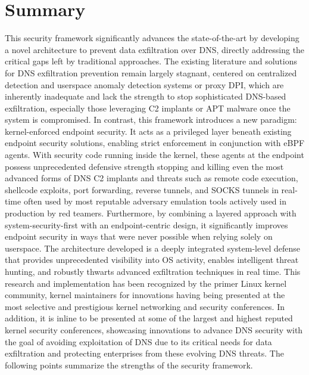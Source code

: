\documentclass [11pt, proquest] {uwthesis}[2020/02/24]
\begin{document}
\section{Summary}
This security framework significantly advances the state-of-the-art by developing a novel architecture to prevent data exfiltration over DNS, directly addressing the critical gaps left by traditional approaches. The existing literature and solutions for DNS exfiltration prevention remain largely stagnant, centered on centralized detection and userspace anomaly detection systems or proxy DPI, which are inherently inadequate and lack the strength to stop sophisticated DNS-based exfiltration, especially those leveraging C2 implants or APT malware once the system is compromised. In contrast, this framework introduces a new paradigm: kernel-enforced endpoint security. It acts as a privileged layer beneath existing endpoint security solutions, enabling strict enforcement in conjunction with eBPF agents. With security code running inside the kernel, these agents at the endpoint possess unprecedented defensive strength stopping and killing even the most advanced forms of DNS C2 implants and threats such as remote code execution, shellcode exploits, port forwarding, reverse tunnels, and SOCKS tunnels in real-time often used by most reputable adversary emulation tools actively used in production by red teamers.
Furthermore, by combining a layered approach with system-security-first with an endpoint-centric design, it significantly improves endpoint security in ways that were never possible when relying solely on userspace. The architecture developed is a deeply integrated system-level defense that provides unprecedented visibility into OS activity, enables intelligent threat hunting, and robustly thwarts advanced exfiltration techniques in real time. This research and implementation has been recognized by the primer Linux kernel community, kernel maintainers for innovations having being presented at the most selective and prestigious kernel networking and security conferences. In addition, it is inline to be presented at some of the largest and highest reputed kernel security conferences, showcasing innovations to advance DNS security with the goal of avoiding exploitation of DNS due to its critical needs for data exfiltration and protecting enterprises from these evolving DNS threats. The following points summarize the strengths of the security framework.
\end{document}
